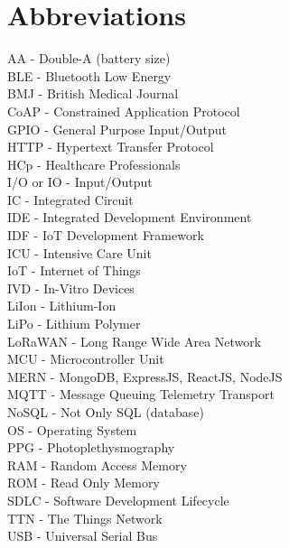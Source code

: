 \chapter{Abbreviations}
AA - Double-A (battery size) \\
BLE - Bluetooth Low Energy\\
BMJ - British Medical Journal\\
CoAP - Constrained Application Protocol \\
GPIO - General Purpose Input/Output\\
HTTP - Hypertext Transfer Protocol\\
HCp - Healthcare Professionals\\
I/O or IO - Input/Output\\
IC - Integrated Circuit\\
IDE - Integrated Development Environment\\
IDF - IoT Development Framework\\
ICU - Intensive Care Unit\\
IoT - Internet of Things\\
IVD - In-Vitro Devices\\
LiIon - Lithium-Ion\\
LiPo - Lithium Polymer\\
LoRaWAN - Long Range Wide Area Network\\
MCU - Microcontroller Unit\\
MERN - MongoDB, ExpressJS, ReactJS, NodeJS\\
MQTT - Message Queuing Telemetry Transport\\
NoSQL - Not Only SQL (database)\\
OS - Operating System\\
PPG - Photoplethysmography\\
RAM - Random Access Memory\\
ROM - Read Only Memory\\
SDLC - Software Development Lifecycle\\
TTN - The Things Network\\
USB - Universal Serial Bus\\